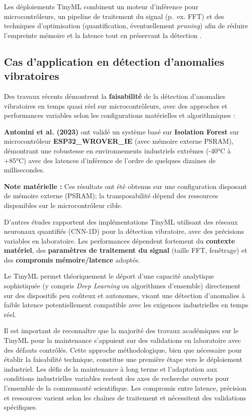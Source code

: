 Les déploiements TinyML combinent un moteur d'inférence pour microcontrôleurs, un pipeline de traitement du signal (p.~ex. FFT) et des techniques d'optimisation (quantification, éventuellement \textit{pruning}) afin de réduire l'empreinte mémoire et la latence tout en préservant la détection \cite{tsoukas2024,arciniegas2025,langer2025}.

\subsection{Cas d'application en détection d'anomalies vibratoires}

Des travaux récents démontrent la \textbf{faisabilité} de la détection d'anomalies vibratoires en temps quasi réel sur microcontrôleurs, avec des approches et performances variables selon les configurations matérielles et algorithmiques :

\textbf{Antonini et al. (2023)} \cite{antonini2023} ont validé un système basé sur \textbf{Isolation Forest} sur microcontrôleur \textbf{ESP32\_WROVER\_IE} (avec mémoire externe PSRAM), démontrant une robustesse en environnements industriels extrêmes (-40°C à +85°C) avec des latences d'inférence de l'ordre de quelques dizaines de millisecondes.

\textbf{Note matérielle :} Ces résultats ont été obtenus sur une configuration disposant de mémoire externe (PSRAM); la transposabilité dépend des ressources disponibles sur le microcontrôleur cible.

D'autres études \cite{arciniegas2025,langer2025,gupta2025} rapportent des implémentations TinyML utilisant des réseaux neuronaux quantifiés (CNN-1D) pour la détection vibratoire, avec des précisions variables en laboratoire. Les performances dépendent fortement du \textbf{contexte matériel}, des \textbf{paramètres de traitement du signal} (taille FFT, fenêtrage) et des \textbf{compromis mémoire/latence} adoptés.

Le TinyML permet théoriquement le déport d'une capacité analytique sophistiquée (y compris \textit{Deep Learning} ou algorithmes d'ensemble) directement sur des dispositifs peu coûteux et autonomes, visant une détection d'anomalies à faible latence potentiellement compatible avec les exigences industrielles en temps réel.

Il est important de reconnaître que la majorité des travaux académiques sur le TinyML pour la maintenance s'appuient sur des validations en laboratoire avec des défauts contrôlés. Cette approche méthodologique, bien que nécessaire pour établir la faisabilité technique, constitue une première étape vers le déploiement industriel. Les défis de la maintenance à long terme et l'adaptation aux conditions industrielles variables restent des axes de recherche ouverts pour l'ensemble de la communauté scientifique. Les compromis entre latence, précision et ressources varient selon les chaînes de traitement et nécessitent des validations spécifiques.


